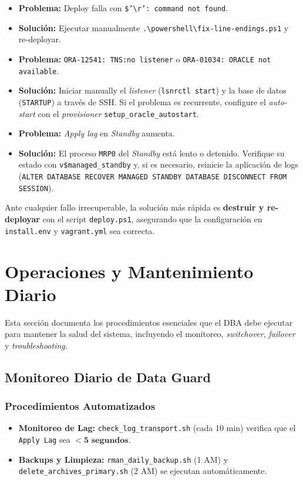 \documentclass[11pt, a4paper]{report}
\begin{document}
\begin{itemize}
    \item \textbf{Problema:} Deploy falla con \texttt{\$'\textbackslash r': command not found}.
\item \textbf{Solución:} Ejecutar manualmente \texttt{.\textbackslash powershell\textbackslash fix-line-endings.ps1} y re-deployar.
    \item \textbf{Problema:} \texttt{ORA-12541: TNS:no listener} o \texttt{ORA-01034: ORACLE not available}.
\item \textbf{Solución:} Iniciar manually el \textit{listener} (\texttt{lsnrctl start}) y la base de datos (\texttt{STARTUP}) a través de SSH. Si el problema es recurrente, configure el \textit{auto-start} con el \textit{provisioner} \texttt{setup\_oracle\_autostart}.
    \item \textbf{Problema:} \textit{Apply lag} en \textit{Standby} aumenta.
\item \textbf{Solución:} El proceso \texttt{MRP0} del \textit{Standby} está lento o detenido. Verifique su estado con \texttt{v\$managed\_standby} y, si es necesario, reinicie la aplicación de logs (\texttt{ALTER DATABASE RECOVER MANAGED STANDBY DATABASE DISCONNECT FROM SESSION}).
\end{itemize}

Ante cualquier fallo irrecuperable, la solución más rápida es \textbf{destruir y re-deployar} con el script \texttt{deploy.ps1}, asegurando que la configuración en \texttt{install.env} y \texttt{vagrant.yml} sea correcta.

\newpage


\chapter{Operaciones y Mantenimiento Diario}

Esta sección documenta los procedimientos esenciales que el DBA debe ejecutar para mantener la salud del sistema, incluyendo el monitoreo, \textit{switchover}, \textit{failover} y \textit{troubleshooting}.
\section{Monitoreo Diario de Data Guard}

\subsection{Procedimientos Automatizados}
\begin{itemize}
    \item \textbf{Monitoreo de Lag:} \texttt{check\_log\_transport.sh} (cada 10 min) verifica que el \texttt{Apply Lag} sea $\mathbf{< 5 \text{ segundos}}$.
\item \textbf{Backups y Limpieza:} \texttt{rman\_daily\_backup.sh} (1 AM) y \texttt{delete\_archives\_primary.sh} (2 AM) se ejecutan automáticamente.
\end{itemize}
\end{document}
